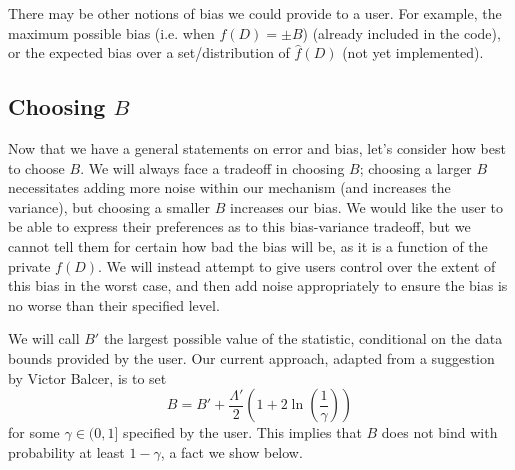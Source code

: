 \documentclass[11pt]{scrartcl} %
\begin{document}
There may be other notions of bias we could provide to a user. For example, the maximum possible bias
(i.e. when $f(D) = \pm B$) (already included in the code), or the expected bias over a set/distribution of $\hat{f}(D)$ (not
yet implemented).

\subsection{Choosing $B$}
\label{subsec:choosing_B}
Now that we have a general statements on error and bias, let's consider how best to choose $B$.
We will always face a tradeoff in choosing $B$; choosing a larger $B$ necessitates adding more noise within
our mechanism (and increases the variance), but choosing a smaller $B$ increases our bias.
We would like the user to be able to express their preferences as to this bias-variance tradeoff,
but we cannot tell them for certain how bad the bias will be, as it is a function of the private $f(D)$.
We will instead attempt to give users control over the extent of this bias in the worst case, and then
add noise appropriately to ensure the bias is no worse than their specified level. \newline

We will call $B'$ the largest possible value of the statistic, conditional on the data bounds provided
by the user. Our current approach, adapted from a suggestion by Victor Balcer, is to set
\[ B = B' + \frac{\Lambda'}{2} \left(1 + 2\ln \left( \frac{1}{\gamma} \right) \right) \]
for some $\gamma \in (0,1]$ specified by the user. This implies that $B$ does not bind with probability at least $1 - \gamma$,
a fact we show below. \newline
\end{document}
